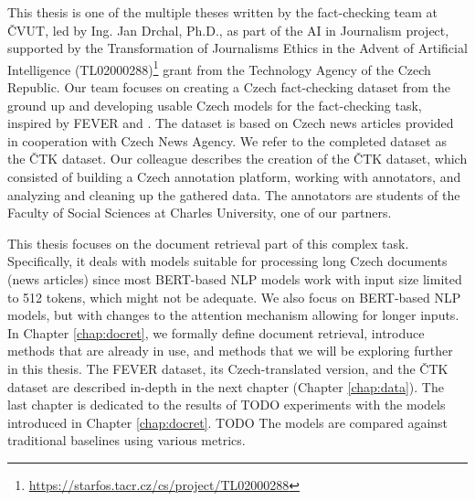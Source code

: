 This thesis is one of the multiple theses written by the fact-checking team at ČVUT, led by Ing. Jan Drchal, Ph.D., as part of the AI in Journalism project, supported by the Transformation of Journalisms Ethics in the Advent of Artificial Intelligence (TL02000288)\footnote{\url{https://starfos.tacr.cz/cs/project/TL02000288}} grant from the Technology Agency of the Czech Republic.
Our team focuses on creating a Czech fact-checking dataset from the ground up and developing usable Czech models for the fact-checking task, inspired by FEVER and \citet{danish_fever}.
The dataset is based on Czech news articles provided in cooperation with Czech News Agency.
We refer to the completed dataset as the ČTK dataset. 
Our colleague \citet{ullrich} describes the creation of the ČTK dataset, which consisted of building a Czech annotation platform, working with annotators, and analyzing and cleaning up the gathered data.
The annotators are students of the Faculty of Social Sciences at Charles University, one of our partners.

This thesis focuses on the document retrieval part of this complex task.
Specifically, it deals with models suitable for processing long Czech documents (news articles) since most BERT-based NLP models work with input size limited to 512 tokens, which might not be adequate.
We also focus on BERT-based NLP models, but with changes to the attention mechanism allowing for longer inputs.
In Chapter \ref{chap:docret}, we formally define document retrieval, introduce methods that are already in use, and methods that we will be exploring further in this thesis. 
The FEVER dataset, its Czech-translated version, and the ČTK dataset are described in-depth in the next chapter (Chapter \ref{chap:data}).
The last chapter is dedicated to the results of TODO experiments with the models introduced in Chapter \ref{chap:docret}.
TODO The models are compared against traditional baselines using various metrics.